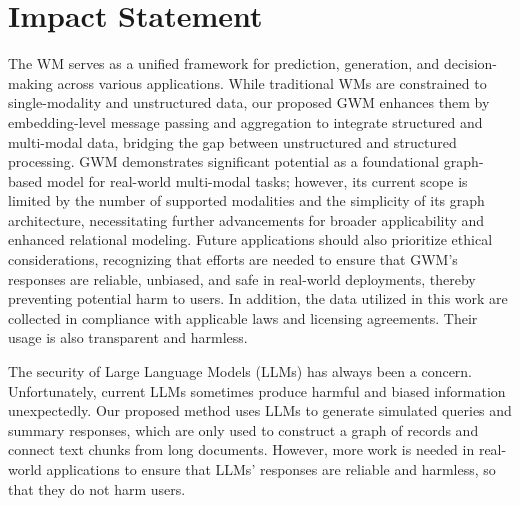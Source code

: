 \documentclass{article}
\theoremstyle{plain}
\theoremstyle{definition}
\theoremstyle{remark}
\begin{document}
\printAffiliationsAndNotice{}  %










\section*{Impact Statement}
The WM serves as a unified framework for prediction, generation, and decision-making across various applications. While traditional WMs are constrained to single-modality and unstructured data, our proposed  GWM enhances them by embedding-level message passing and aggregation to integrate structured and multi-modal data, bridging the gap between unstructured and structured processing. GWM demonstrates significant potential as a foundational graph-based model for real-world multi-modal tasks; however, its current scope is limited by the number of supported modalities and the simplicity of its graph architecture, necessitating further advancements for broader applicability and enhanced relational modeling. Future applications should also prioritize ethical considerations, recognizing that efforts are needed to ensure that GWM's responses are reliable, unbiased, and safe in real-world deployments, thereby preventing potential harm to users. In addition, the data utilized in this work are collected in compliance with applicable laws and licensing agreements. Their usage is also transparent and harmless.

The security of Large Language Models (LLMs) has always been a concern. Unfortunately, current LLMs sometimes produce harmful and biased information unexpectedly. Our proposed method uses LLMs to generate simulated queries and summary responses, which are only used to construct a graph of records and connect text chunks from long documents. However, more work is needed in real-world applications to ensure that LLMs' responses are reliable and harmless, so that they do not harm users. 





\newpage
\appendix

% 
\end{document}
